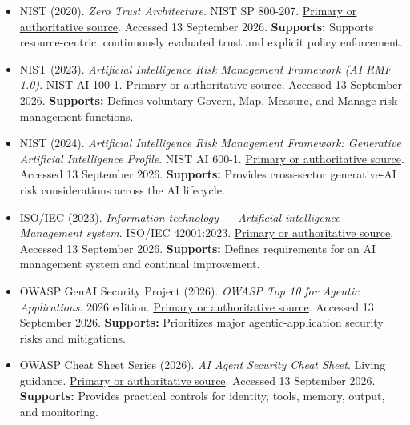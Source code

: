 \begin{itemize}

\item {}\textbf{} NIST (2020). \emph{Zero Trust Architecture}. NIST SP 800-207. \href{\detokenize{https://csrc.nist.gov/pubs/sp/800/207/final}}{Primary or authoritative source}. Accessed 13 September 2026. \textbf{Supports:} Supports resource-centric, continuously evaluated trust and explicit policy enforcement.

\item {}\textbf{} NIST (2023). \emph{Artificial Intelligence Risk Management Framework (AI RMF 1.0)}. NIST AI 100-1. \href{\detokenize{https://www.nist.gov/itl/ai-risk-management-framework}}{Primary or authoritative source}. Accessed 13 September 2026. \textbf{Supports:} Defines voluntary Govern, Map, Measure, and Manage risk-management functions.

\item {}\textbf{} NIST (2024). \emph{Artificial Intelligence Risk Management Framework: Generative Artificial Intelligence Profile}. NIST AI 600-1. \href{\detokenize{https://doi.org/10.6028/NIST.AI.600-1}}{Primary or authoritative source}. Accessed 13 September 2026. \textbf{Supports:} Provides cross-sector generative-AI risk considerations across the AI lifecycle.

\item {}\textbf{} ISO/IEC (2023). \emph{Information technology — Artificial intelligence — Management system}. ISO/IEC 42001:2023. \href{\detokenize{https://www.iso.org/standard/42001}}{Primary or authoritative source}. Accessed 13 September 2026. \textbf{Supports:} Defines requirements for an AI management system and continual improvement.

\item {}\textbf{} OWASP GenAI Security Project (2026). \emph{OWASP Top 10 for Agentic Applications}. 2026 edition. \href{\detokenize{https://genai.owasp.org/resource/owasp-top-10-for-agentic-applications-for-2026/}}{Primary or authoritative source}. Accessed 13 September 2026. \textbf{Supports:} Prioritizes major agentic-application security risks and mitigations.

\item {}\textbf{} OWASP Cheat Sheet Series (2026). \emph{AI Agent Security Cheat Sheet}. Living guidance. \href{\detokenize{https://cheatsheetseries.owasp.org/cheatsheets/AI_Agent_Security_Cheat_Sheet.html}}{Primary or authoritative source}. Accessed 13 September 2026. \textbf{Supports:} Provides practical controls for identity, tools, memory, output, and monitoring.


\end{itemize}
